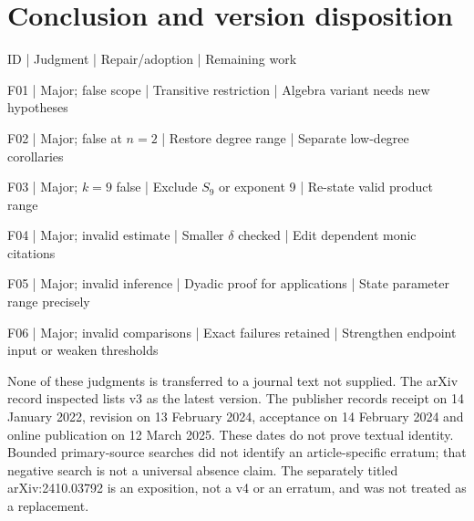 \documentclass[10pt]{article}
\begin{document}
\section*{Conclusion and version disposition}
ID | Judgment | Repair/adoption | Remaining work\par
F01 | Major; false scope | Transitive restriction | Algebra variant needs new hypotheses\par
F02 | Major; false at \(n=2\) | Restore degree range | Separate low-degree corollaries\par
F03 | Major; \(k=9\) false | Exclude \(S_9\) or exponent 9 | Re-state valid product range\par
F04 | Major; invalid estimate | Smaller \(\delta\) checked | Edit dependent monic citations\par
F05 | Major; invalid inference | Dyadic proof for applications | State parameter range precisely\par
F06 | Major; invalid comparisons | Exact failures retained | Strengthen endpoint input or weaken thresholds\par
None of these judgments is transferred to a journal text not supplied. The arXiv record inspected lists v3 as the latest version. The publisher records receipt on 14 January 2022, revision on 13 February 2024, acceptance on 14 February 2024 and online publication on 12 March 2025. These dates do not prove textual identity. Bounded primary-source searches did not identify an article-specific erratum; that negative search is not a universal absence claim. The separately titled arXiv:2410.03792 is an exposition, not a v4 or an erratum, and was not treated as a replacement.\par
\end{document}
